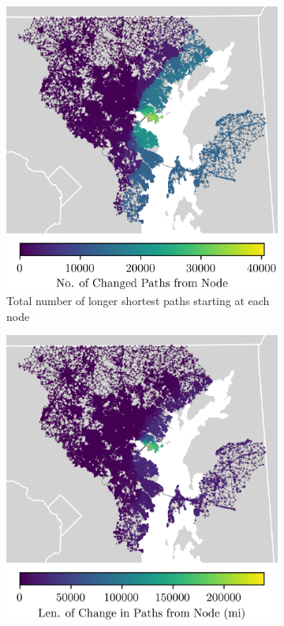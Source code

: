 \documentclass[11pt]{article}
\numberwithin{equation}{section} %
\numberwithin{figure}{section} %
\numberwithin{table}{section} %
\theoremstyle{definition}
\begin{document}
\begin{figure}[t!]
	\caption{Changes in shortest paths}
  \begin{subfigure}{0.49\textwidth}
    \centering
    \includegraphics[width=\textwidth]{maps/no_changed_paths.png}
    \caption{Total number of longer shortest paths starting at each node}
  \end{subfigure}
  \begin{subfigure}{0.49\textwidth}
    \centering
    \includegraphics[width=\textwidth]{maps/dist_changed_paths.png}

\end{subfigure}
\end{figure}
\end{document}
